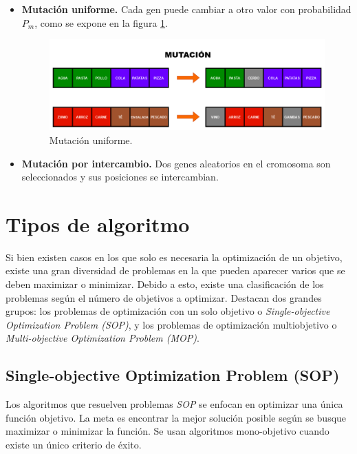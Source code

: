 \begin{itemize}
  \item \textbf{Mutación uniforme.} Cada gen puede cambiar a otro valor con probabilidad \(P_m\), como se expone en la figura \ref{fig:mutación}.

  \begin{figure}[H]
    \centering
    \includegraphics[width=1\textwidth]{figures/mutacion.png}
    \caption{Mutación uniforme.}
    \label{fig:mutación}
  \end{figure}

  \item \textbf{Mutación por intercambio.} Dos genes aleatorios en el cromosoma son seleccionados y sus posiciones se intercambian. 
\end{itemize}

\section{Tipos de algoritmo}

Si bien existen casos en los que solo es necesaria la optimización de un objetivo, existe una gran diversidad de problemas en la que pueden aparecer varios que se deben maximizar o minimizar. Debido a esto, existe una clasificación de los problemas según el número de objetivos a optimizar. Destacan dos grandes grupos: los problemas de optimización con un solo objetivo o \textit{Single-objective Optimization Problem (SOP)}, y los problemas de optimización multiobjetivo o \textit{Multi-objective Optimization Problem (MOP)}.

\subsection{Single-objective Optimization Problem (SOP)}

Los algoritmos que resuelven problemas \textit{SOP} se enfocan en optimizar una única función objetivo. La meta es encontrar la mejor solución posible según se busque maximizar o minimizar la función. Se usan algoritmos mono-objetivo cuando existe un único criterio de éxito.

